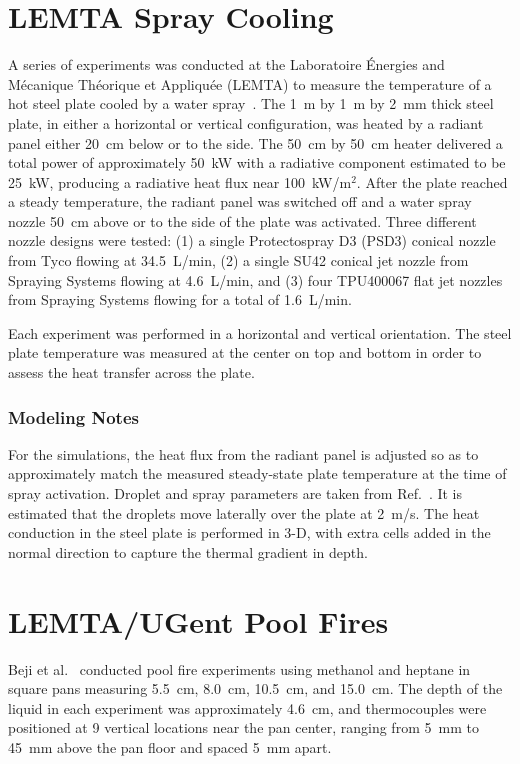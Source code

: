 \section{LEMTA Spray Cooling}
\label{LEMTA_Spray_Cooling_Description}

A series of experiments was conducted at the Laboratoire \'Energies and M\'ecanique Th\'eorique et Appliqu\'ee (LEMTA) to measure the temperature of a hot steel plate cooled by a water spray~\cite{Acem:ISFEH2022}. The 1~m by 1~m by 2~mm thick steel plate, in either a horizontal or vertical configuration, was heated by a radiant panel either 20~cm below or to the side. The 50~cm by 50~cm heater delivered a total power of approximately 50~kW with a radiative component estimated to be 25~kW, producing a radiative heat flux near 100~kW/m$^2$.  After the plate reached a steady temperature, the radiant panel was switched off and a water spray nozzle 50~cm above or to the side of the plate was activated. Three different nozzle designs were tested: (1) a single Protectospray D3 (PSD3) conical nozzle from Tyco flowing at 34.5~L/min, (2) a single SU42 conical jet nozzle from Spraying Systems flowing at 4.6~L/min, and (3) four TPU400067 flat jet nozzles from Spraying Systems flowing for a total of 1.6~L/min.

Each experiment was performed in a horizontal and vertical orientation. The steel plate temperature was measured at the center on top and bottom in order to assess the heat transfer across the plate.

\subsubsection{Modeling Notes}

For the simulations, the heat flux from the radiant panel is adjusted so as to approximately match the measured steady-state plate temperature at the time of spray activation. Droplet and spray parameters are taken from Ref.~\cite{Acem:ISFEH2022}. It is estimated that the droplets move laterally over the plate at 2~m/s. The heat conduction in the steel plate is performed in 3-D, with extra cells added in the normal direction to capture the thermal gradient in depth.


\section{LEMTA/UGent Pool Fires}
\label{LEMTA_UGent_Pool_Fires_Description}

Beji et al.~\cite{Beji:FSJ2024} conducted pool fire experiments using methanol and heptane in square pans measuring 5.5~cm, 8.0~cm, 10.5~cm, and 15.0~cm. The depth of the liquid in each experiment was approximately 4.6~cm, and thermocouples were positioned at 9 vertical locations near the pan center, ranging from 5~mm to 45~mm above the pan floor and spaced 5~mm apart.


